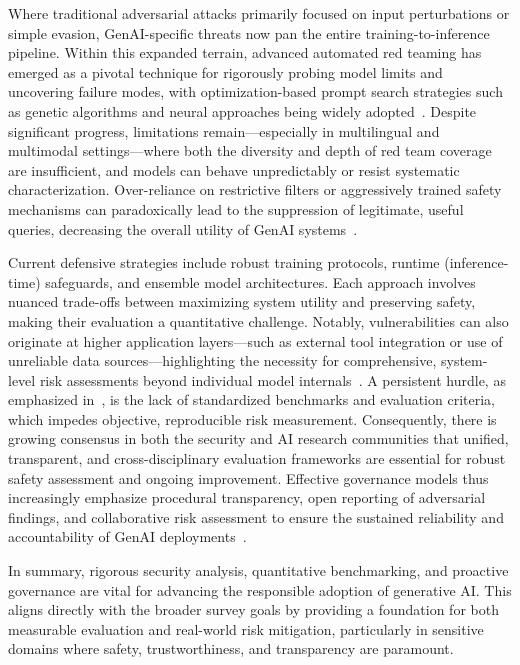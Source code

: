 \documentclass[sigconf]{acmart}
\begin{document}
Where traditional adversarial attacks primarily focused on input perturbations or simple evasion, GenAI-specific threats now pan the entire training-to-inference pipeline. Within this expanded terrain, advanced automated red teaming has emerged as a pivotal technique for rigorously probing model limits and uncovering failure modes, with optimization-based prompt search strategies such as genetic algorithms and neural approaches being widely adopted~\cite{ref3}. Despite significant progress, limitations remain—especially in multilingual and multimodal settings—where both the diversity and depth of red team coverage are insufficient, and models can behave unpredictably or resist systematic characterization. Over-reliance on restrictive filters or aggressively trained safety mechanisms can paradoxically lead to the suppression of legitimate, useful queries, decreasing the overall utility of GenAI systems~\cite{ref3}.

Current defensive strategies include robust training protocols, runtime (inference-time) safeguards, and ensemble model architectures. Each approach involves nuanced trade-offs between maximizing system utility and preserving safety, making their evaluation a quantitative challenge. Notably, vulnerabilities can also originate at higher application layers—such as external tool integration or use of unreliable data sources—highlighting the necessity for comprehensive, system-level risk assessments beyond individual model internals~\cite{ref3}. A persistent hurdle, as emphasized in~\cite{ref3}, is the lack of standardized benchmarks and evaluation criteria, which impedes objective, reproducible risk measurement. Consequently, there is growing consensus in both the security and AI research communities that unified, transparent, and cross-disciplinary evaluation frameworks are essential for robust safety assessment and ongoing improvement. Effective governance models thus increasingly emphasize procedural transparency, open reporting of adversarial findings, and collaborative risk assessment to ensure the sustained reliability and accountability of GenAI deployments~\cite{ref3,ref7}.

In summary, rigorous security analysis, quantitative benchmarking, and proactive governance are vital for advancing the responsible adoption of generative AI. This aligns directly with the broader survey goals by providing a foundation for both measurable evaluation and real-world risk mitigation, particularly in sensitive domains where safety, trustworthiness, and transparency are paramount.
\end{document}
